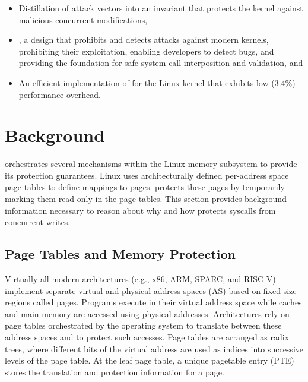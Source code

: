 \documentclass[letterpaper,twocolumn,10pt]{article}
\begin{document}
\begin{itemize}[noitemsep]
\item Distillation of \tocttou attack vectors into an invariant that protects
the kernel against malicious concurrent modifications,
\item \midas, a design that prohibits and detects
\tocttou attacks against modern kernels, prohibiting their exploitation,
enabling developers to detect \tocttou bugs, and providing the foundation for
safe system call interposition and validation, and
\item An efficient implementation of \midas for the Linux kernel that exhibits
low ($3.4\%$) performance overhead.
\end{itemize}


\section{Background}

\midas orchestrates several mechanisms within the Linux memory subsystem
to provide its protection guarantees.
Linux uses architecturally defined per-address space page tables to define
mappings to pages.
\midas protects these pages by temporarily marking them read-only in the
page tables.
This section provides background information necessary to reason about
why and how \midas protects syscalls from concurrent writes.


\subsection{Page Tables and Memory Protection}

Virtually all modern architectures (e.g., x86, ARM, SPARC, and
RISC-V) implement separate virtual and physical
address spaces (AS) based on fixed-size regions called pages.
%
%
Programs execute in their virtual address space while caches and main memory
are accessed using physical addresses.
Architectures rely on page tables orchestrated by the operating system
to translate between these address spaces and to protect such accesses.
Page tables are arranged as radix trees, where different bits of the
virtual address are used as indices into successive levels of the page table.
At the leaf page table, a unique pagetable entry (PTE) stores the
translation and protection information for a page.
\end{document}
